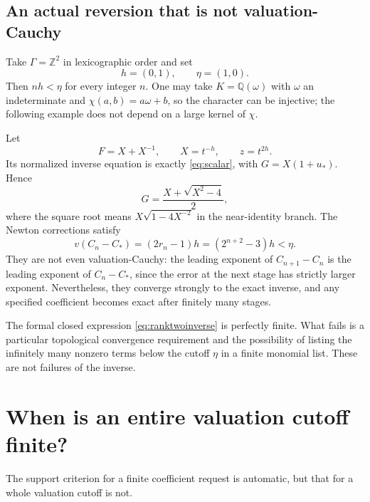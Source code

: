 \documentclass[11pt,a4paper]{article}
\theoremstyle{definition}
\theoremstyle{remark}
\newcommand{\Z}{\mathbb Z}
\newcommand{\Q}{\mathbb Q}
\begin{document}
\subsection{An actual reversion that is not valuation-Cauchy}
Take $\Gamma=\Z^2$ in lexicographic order and set
\[
 h=(0,1),\qquad \eta=(1,0).
\]
Then $nh<\eta$ for every integer $n$. One may take
$K=\Q(\omega)$ with $\omega$ an indeterminate and
$\chi(a,b)=a\omega+b$, so the character can be injective; the following
example does not depend on a large kernel of $\chi$.

Let
\begin{equation}\label{eq:ranktwoF}
 F=X+X^{-1},\qquad X=t^{-h},\qquad z=t^{2h}.
\end{equation}
Its normalized inverse equation is exactly \eqref{eq:scalar}, with
$G=X(1+u_*)$. Hence
\begin{equation}\label{eq:ranktwoinverse}
 G=\frac{X+\sqrt{X^2-4}}2,
\end{equation}
where the square root means $X\sqrt{1-4X^{-2}}$ in the near-identity branch.
The Newton corrections satisfy
\begin{equation}\label{eq:ranktwov}
 v(C_n-C_*)=(2r_n-1)h=(2^{n+2}-3)h<\eta.
\end{equation}
They are not even valuation-Cauchy: the leading exponent of
$C_{n+1}-C_n$ is the leading exponent of $C_n-C_*$, since the error at the
next stage has strictly larger exponent. Nevertheless, they converge
strongly to the exact inverse, and any specified coefficient becomes exact
after finitely many stages.

The formal closed expression \eqref{eq:ranktwoinverse} is perfectly finite.
What fails is a particular topological convergence requirement and the
possibility of listing the infinitely many nonzero terms below the cutoff
$\eta$ in a finite monomial list. These are not failures of the inverse.

\section{When is an entire valuation cutoff finite?}
\label{sec:cuts}

The support criterion for a finite coefficient request is automatic, but
that for a whole valuation cutoff is not.
\end{document}
